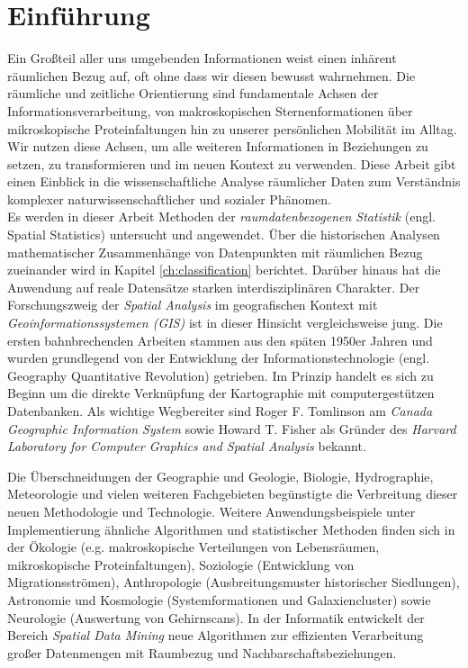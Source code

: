 \chapter{Einführung} %


Ein Großteil aller uns umgebenden Informationen weist einen inhärent räumlichen Bezug auf, oft ohne dass wir diesen bewusst wahrnehmen.
Die räumliche und zeitliche Orientierung sind fundamentale Achsen der Informationsverarbeitung, 
von makroskopischen Sternenformationen über mikroskopische Proteinfaltungen hin zu unserer persönlichen Mobilität im Alltag. 
Wir nutzen diese Achsen, um alle weiteren Informationen in Beziehungen zu setzen, zu transformieren und im neuen Kontext zu verwenden. 
Diese Arbeit gibt einen Einblick in die wissenschaftliche Analyse räumlicher Daten 
zum Verständnis komplexer naturwissenschaftlicher und sozialer Phänomen.\\

Es werden in dieser Arbeit Methoden der \emph{raumdatenbezogenen Statistik} (engl. Spatial Statistics) untersucht und angewendet. 
Über die historischen Analysen mathematischer Zusammenhänge von Datenpunkten mit räumlichen Bezug zueinander wird in Kapitel \ref{ch:classification} berichtet.
Darüber hinaus hat die Anwendung auf reale Datensätze starken interdisziplinären Charakter. 
Der Forschungszweig der \emph{Spatial Analysis} im geografischen Kontext mit \emph{Geoinformationssystemen (GIS)} ist in dieser Hinsicht vergleichsweise jung. 
Die ersten bahnbrechenden Arbeiten stammen aus den späten 1950er Jahren und wurden grundlegend von der 
Entwicklung der Informationstechnologie (engl. \glqq Geography Quantitative Revolution\grqq) getrieben. 
Im Prinzip handelt es sich zu Beginn um die direkte Verknüpfung der Kartographie mit computergestützen Datenbanken.
Als wichtige Wegbereiter sind Roger F. Tomlinson am \emph{Canada Geographic Information System} sowie 
Howard T. Fisher als Gründer des \emph{Harvard Laboratory for Computer Graphics and Spatial Analysis} bekannt.

Die Überschneidungen der Geographie und Geologie, Biologie, Hydrographie, Meteorologie und 
vielen weiteren Fachgebieten begünstigte die Verbreitung dieser neuen Methodologie und Technologie. 
Weitere Anwendungsbeispiele unter Implementierung ähnliche Algorithmen und statistischer Methoden finden sich 
in der Ökologie (e.g. makroskopische Verteilungen von Lebensräumen, mikroskopische Proteinfaltungen), 
Soziologie (Entwicklung von Migrationsströmen), Anthropologie (Ausbreitungsmuster historischer Siedlungen),  
Astronomie und Kosmologie (Systemformationen und Galaxiencluster) sowie Neurologie (Auswertung von Gehirnscans). 
In der Informatik entwickelt der Bereich \emph{Spatial Data Mining} neue Algorithmen zur effizienten Verarbeitung großer 
Datenmengen mit Raumbezug und Nachbarschaftsbeziehungen.\\

